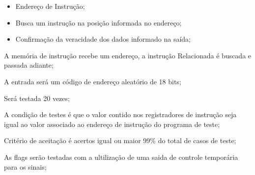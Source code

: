 \documentclass{article}
\begin{document}
  	\begin{itemize}
     \item Endereço de Instrução;
     \end{itemize}
    
  \actions
  \begin{itemize}
     \item Busca um instrução na posição informada no endereço;
    \end{itemize}
  
  \results
  	\begin{itemize}
     \item Confirmação da veracidade dos dados informado na saída;
    \end{itemize}
  
  \begin{mainflow}
    \item A memória de instrução recebe um endereço, a instrução
Relacionada é buscada e passada adiante;
    \item A entrada será um código de endereço aleatório  de 18 bits;
    
    \item Será testada 20 vezes;
    \item A condição de testes é que o valor contido nos registradores de instrução seja igual ao valor associado ao endereço de instrução do programa de teste;
    
    \item Critério de aceitação é acertos igual ou maior 99\% do total de casos de teste;
    \item As flags serão testadas com a ultilização de uma saida de controle temporária para os sinais;
  \end{mainflow}

% 
% 
\end{document}
